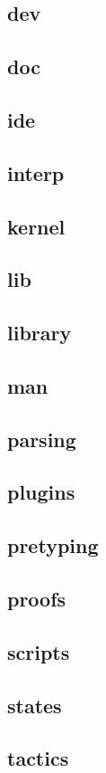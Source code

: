 \documentclass[a4paper,oneside]{book}
\begin{document}
\subsection{dev}
\subsection{doc}
\subsection{ide}
\subsection{interp}
\subsection{kernel}
\subsection{lib}
\subsection{library}
\subsection{man}
\subsection{parsing}
\subsection{plugins}
\subsection{pretyping}
\subsection{proofs}
\subsection{scripts}
\subsection{states}
\subsection{tactics}
\end{document}
